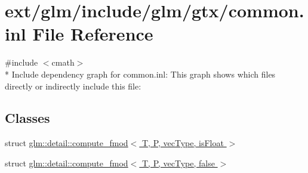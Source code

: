\hypertarget{common_8inl}{\section{ext/glm/include/glm/gtx/common.inl File Reference}
\label{common_8inl}
}
{\ttfamily \#include $<$cmath$>$}\\*
Include dependency graph for common.\-inl\-:
This graph shows which files directly or indirectly include this file\-:
\subsection*{Classes}
\begin{DoxyCompactItemize}
\item 
struct \hyperlink{structglm_1_1detail_1_1compute__fmod}{glm\-::detail\-::compute\-\_\-fmod$<$ T, P, vec\-Type, is\-Float $>$}
\item 
struct \hyperlink{structglm_1_1detail_1_1compute__fmod_3_01_t_00_01_p_00_01vec_type_00_01false_01_4}{glm\-::detail\-::compute\-\_\-fmod$<$ T, P, vec\-Type, false $>$}
\end{DoxyCompactItemize}
